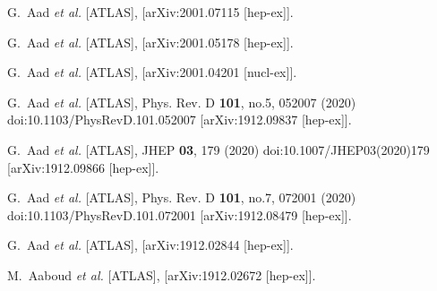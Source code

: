 \begin{thebibliography}{9}
G.~Aad \textit{et al.} [ATLAS],
[arXiv:2001.07115 [hep-ex]].

G.~Aad \textit{et al.} [ATLAS],
[arXiv:2001.05178 [hep-ex]].

G.~Aad \textit{et al.} [ATLAS],
[arXiv:2001.04201 [nucl-ex]].

G.~Aad \textit{et al.} [ATLAS],
Phys. Rev. D \textbf{101}, no.5, 052007 (2020)
doi:10.1103/PhysRevD.101.052007
[arXiv:1912.09837 [hep-ex]].

G.~Aad \textit{et al.} [ATLAS],
JHEP \textbf{03}, 179 (2020)
doi:10.1007/JHEP03(2020)179
[arXiv:1912.09866 [hep-ex]].

G.~Aad \textit{et al.} [ATLAS],
Phys. Rev. D \textbf{101}, no.7, 072001 (2020)
doi:10.1103/PhysRevD.101.072001
[arXiv:1912.08479 [hep-ex]].

G.~Aad \textit{et al.} [ATLAS],
[arXiv:1912.02844 [hep-ex]].

M.~Aaboud \textit{et al.} [ATLAS],
[arXiv:1912.02672 [hep-ex]].


\end{thebibliography}
